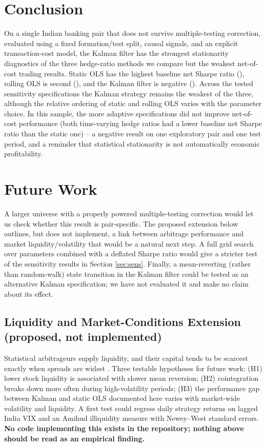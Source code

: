 \documentclass[11pt,a4paper]{article}
\begin{document}
\section{Conclusion}\label{sec:concl}

On a single Indian banking pair that does not survive multiple-testing correction, evaluated using a fixed formation/test split, causal signals, and an explicit transaction-cost model, the Kalman filter has the strongest stationarity diagnostics of the three hedge-ratio methods we compare but the weakest net-of-cost trading results. Static OLS has the highest baseline net Sharpe ratio (\NetSharpeStatic{}), rolling OLS is second (\NetSharpeRolling{}), and the Kalman filter is negative (\NetSharpeKalman{}). Across the tested sensitivity specifications the Kalman strategy remains the weakest of the three, although the relative ordering of static and rolling OLS varies with the parameter choice. In this sample, the more adaptive specifications did not improve net-of-cost performance (both time-varying hedge ratios had a lower baseline net Sharpe ratio than the static one) -- a negative result on one exploratory pair and one test period, and a reminder that statistical stationarity is not automatically economic profitability.

\section{Future Work}\label{sec:future}

A larger universe with a properly powered multiple-testing correction would let us check whether this result is pair-specific. The proposed extension below outlines, but does not implement, a link between arbitrage performance and market liquidity/volatility that would be a natural next step. A full grid search over parameters combined with a deflated Sharpe ratio \citep{bailey2014deflated} would give a stricter test of the sensitivity results in Section \ref{sec:sens}. Finally, a mean-reverting (rather than random-walk) state transition in the Kalman filter could be tested as an alternative Kalman specification; we have not evaluated it and make no claim about its effect.

\subsection*{Liquidity and Market-Conditions Extension (proposed, not implemented)}
Statistical arbitrageurs supply liquidity, and their capital tends to be scarcest exactly when spreads are widest \citep{brunnermeier2009market,nagel2012evaporating}. Three testable hypotheses for future work: (H1) lower stock liquidity is associated with slower mean reversion; (H2) cointegration breaks down more often during high-volatility periods; (H3) the performance gap between Kalman and static OLS documented here varies with market-wide volatility and liquidity. A first test could regress daily strategy returns on lagged India VIX and an Amihud illiquidity measure \citep{amihud2002illiquidity} with Newey--West standard errors. \textbf{No code implementing this exists in the repository; nothing above should be read as an empirical finding.}
\end{document}
